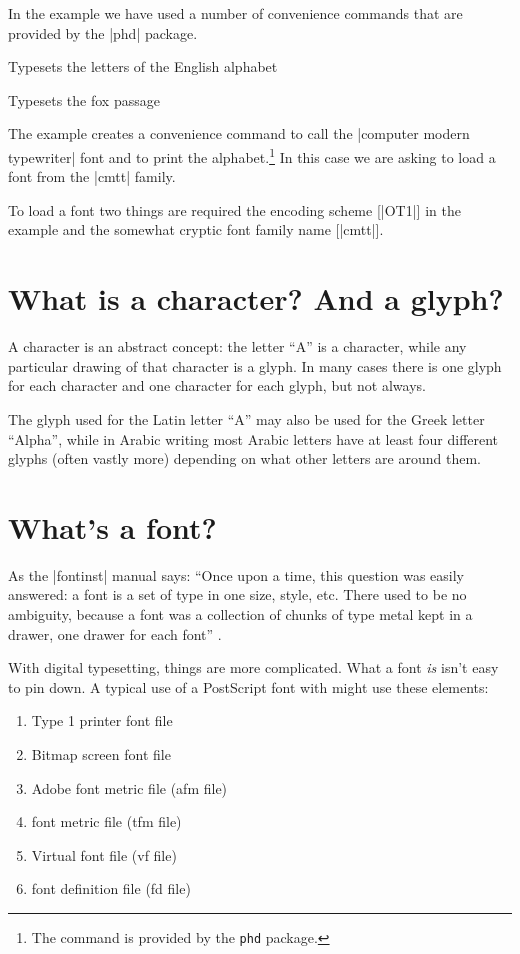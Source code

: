 In the example we have used a number of convenience commands that are provided by the |phd| package.

\CMDI{\alphabet} Typesets the letters of the English alphabet

\CMDI{\fox} Typesets the fox passage

The example  creates a convenience command to call the |computer modern typewriter| font and to print the alphabet.\footnote{The command  is provided by the \texttt{phd} package.} In this case we are asking \latex to load a font from the |cmtt| family. 

To load a font two things are required the encoding scheme [|OT1|] in the example and the somewhat cryptic font family name [|cmtt|].

\section{What is a character? And a glyph?}

A character is an abstract
concept: the letter “A” is a character, while any
particular drawing of that character is a glyph. In many
cases there is one glyph for each character and one character
for each glyph, but not always.

The glyph used for the Latin letter “A” may also be
used for the Greek letter “Alpha”, while in Arabic writing
most Arabic letters have at least four different glyphs
(often vastly more) depending on what other letters are
around them.

\section{What’s a font?}

As the |fontinst| manual says: ``Once upon a time, this question was easily answered: a font is a set of type
in one size, style, etc. There used to be no ambiguity, because a font was a
collection of chunks of type metal kept in a drawer, one drawer for each font'' \citet{fontinst}.


With digital typesetting, things are more complicated. What a font
\textit{is} isn't easy to pin down. A typical use of a PostScript font with \latex might
use these elements:

\begin{enumerate}
\item Type 1 printer font file
\item Bitmap screen font file
\item Adobe font metric file (afm file)
\item \tex font metric file (tfm file)
\item Virtual font file (vf file)
\item font definition file (fd file)
\end{enumerate}

